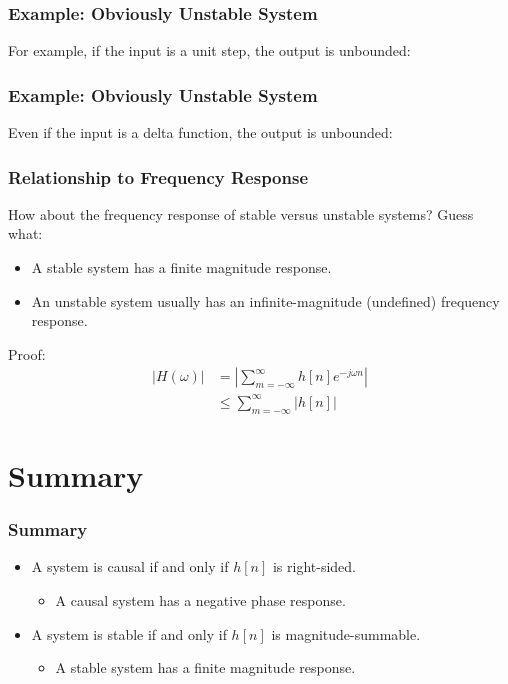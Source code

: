 \documentclass{beamer}
\begin{document}
\begin{frame}
  \frametitle{Example: Obviously Unstable System}

  For example, if the input is a unit step, the output is unbounded:
  \centerline{}
\end{frame}

\begin{frame}
  \frametitle{Example: Obviously Unstable System}

  Even if the input is a delta function, the output is unbounded:
  \centerline{}
\end{frame}

\begin{frame}
  \frametitle{Relationship to Frequency Response}

  How about the frequency response of stable versus unstable systems?
  Guess what:
  \begin{itemize}
  \item A stable system has a finite magnitude response.
  \item An unstable system usually has an infinite-magnitude (undefined) frequency response.
  \end{itemize}

  Proof:
  \begin{align*}
    |H(\omega)| &= \left|\sum_{m=-\infty}^\infty h[n]e^{-j\omega n}\right|\\
    &\le \sum_{m=-\infty}^\infty \left|h[n]\right|
  \end{align*}
\end{frame}

\section[Summary]{Summary}
\setcounter{subsection}{1}

\begin{frame}
  \frametitle{Summary}

  \begin{itemize}
  \item A system is causal if and only if $h[n]$ is right-sided.
    \begin{itemize}
    \item A causal system has a negative phase response.
    \end{itemize}
  \item A system is stable if and only if $h[n]$ is
    magnitude-summable.
    \begin{itemize}
    \item A stable system has a finite magnitude response.
    \end{itemize}
  \end{itemize}
\end{frame}
\end{document}

